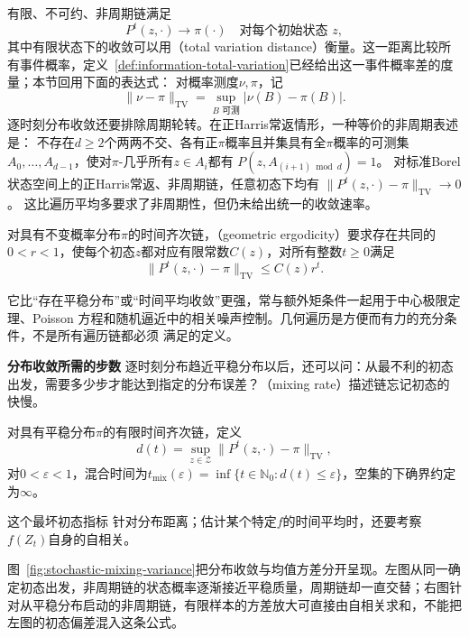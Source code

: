 有限、不可约、非周期链满足
\begin{equation}
  P^t(z,\cdot)\longrightarrow\pi(\cdot)
  \quad\text{对每个初始状态 }z,
  \label{eq:stoch-finite-chain-distribution-convergence}
\end{equation}
其中有限状态下的收敛可以用（total variation distance）衡量。这一距离比较所有事件概率，定义~\ref{def:information-total-variation}已经给出这一事件概率差的度量；本节回用下面的表达式：
对概率测度$\nu,\pi$，记
\[
  \lVert\nu-\pi\rVert_{\mathrm{TV}}
  =
  \sup_{B\text{ 可测}}|\nu(B)-\pi(B)|.
\]
逐时刻分布收敛还要排除周期轮转。在正Harris常返情形，一种等价的非周期表述是：
不存在\(d\geq2\)个两两不交、各有正\(\pi\)概率且并集具有全\(\pi\)概率的可测集
\(A_0,\ldots,A_{d-1}\)，使对\(\pi\)-几乎所有\(z\in A_i\)都有
\(P(z,A_{(i+1)\bmod d})=1\)。
对标准Borel状态空间上的正Harris常返、非周期链，任意初态下均有
\(\|P^t(z,\cdot)-\pi\|_{\mathrm{TV}}\to0\)。
这比遍历平均多要求了非周期性，但仍未给出统一的收敛速率。

\begin{definition}[几何遍历性]
  \label{def:stoch-geometric-ergodicity}
  对具有不变概率分布\(\pi\)的时间齐次链，（geometric ergodicity）要求存在共同的$0<r<1$，使每个初态\(z\)都对应有限常数$C(z)$，对所有整数\(t\geq0\)满足
\[
  \lVert P^t(z,\cdot)-\pi\rVert_{\mathrm{TV}}
  \leq C(z)r^t.
\]
\end{definition}
它比“存在平稳分布”或“时间平均收敛”更强，常与额外矩条件一起用于中心极限定理、Poisson
方程和随机逼近中的相关噪声控制。几何遍历是方便而有力的充分条件，不是所有遍历链都必须
满足的定义。

\par\medskip\noindent\textbf{分布收敛所需的步数}\quad
逐时刻分布趋近平稳分布以后，还可以问：从最不利的初态出发，需要多少步才能达到指定的分布误差？（mixing rate）描述链忘记初态的快慢。
\begin{definition}[有限链的混合时间]
  \label{def:stoch-finite-mixing-time}
对具有平稳分布\(\pi\)的有限时间齐次链，定义
\[
  d(t)
  =
  \sup_{z\in\mathcal{Z}}
  \lVert P^t(z,\cdot)-\pi\rVert_{\mathrm{TV}},
\]
对\(0<\varepsilon<1\)，混合时间为\(t_{\mathrm{mix}}(\varepsilon)=\inf\{t\in\mathbb N_0:d(t)\leq\varepsilon\}\)，空集的下确界约定为\(\infty\)。
\end{definition}
这个最坏初态指标
针对分布距离；估计某个特定$f$的时间平均时，还要考察$f(Z_t)$自身的自相关。

图~\ref{fig:stochastic-mixing-variance}把分布收敛与均值方差分开呈现。左图从同一确定初态出发，非周期链的状态概率逐渐接近平稳质量，周期链却一直交替；右图针对从平稳分布启动的非周期链，有限样本的方差放大可直接由自相关求和，不能把左图的初态偏差混入这条公式。

